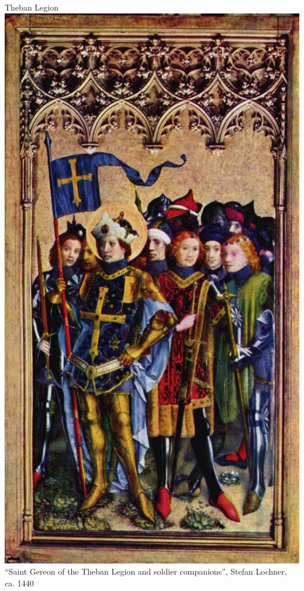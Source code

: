 \begin{frame}{Theban Legion}
    \centering
    \includegraphics[height=0.7\textheight]{img/theban-3.jpg} \\
    ``Saint Gereon of the Theban Legion and soldier companions'', Stefan Lochner, ca. 1440 \\
\end{frame}

